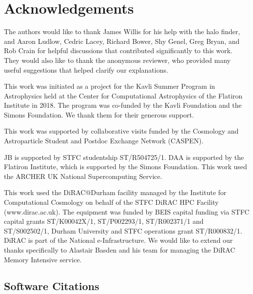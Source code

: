 \section{Acknowledgements}
\label{sec:acknowledgements}

The authors would like to thank James Willis for his help with the
\velociraptor{} halo finder, and Aaron Ludlow, Cedric Lacey, Richard Bower,
Shy Genel, Greg Bryan, and Rob Crain for helpful discussions that contributed
significantly to this work. They would also like to thank the anonymous
reviewer, who provided many useful suggestions that helped clarify our
explanations.

This work was initiated as a project for the Kavli Summer Program in
Astrophysics held at the Center for Computational Astrophysics of the
Flatiron Institute in 2018. The program was co-funded by the Kavli Foundation
and the Simons Foundation. We thank them for their generous support.

This work was supported by collaborative visits funded by the Cosmology and
Astroparticle Student and Postdoc Exchange Network (CASPEN).

JB is supported by STFC studentship ST/R504725/1. DAA is supported by the
Flatiron Institute, which is supported by the Simons Foundation. This work
used the ARCHER UK National Supercomputing Service.

This work used the DiRAC@Durham facility managed by the Institute for
Computational Cosmology on behalf of the STFC DiRAC HPC Facility
(www.dirac.ac.uk). The equipment was funded by BEIS capital funding via STFC
capital grants ST/K00042X/1, ST/P002293/1, ST/R002371/1 and ST/S002502/1,
Durham University and STFC operations grant ST/R000832/1. DiRAC is part of
the National e-Infrastructure. We would like to extend our thanks specifically
to Alastair Basden and his team for managing the DiRAC Memory Intensive service. 

\subsection{Software Citations}

